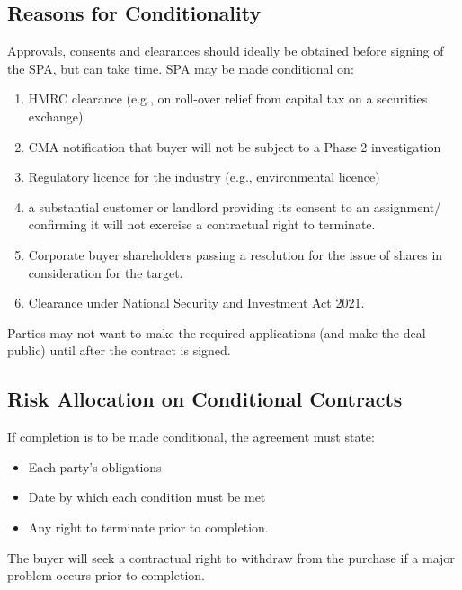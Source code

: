 \documentclass[
]{article}
\providecommand{\tightlist}{%
  \setlength{\itemsep}{0pt}\setlength{\parskip}{0pt}}
\begin{document}
\hypertarget{reasons-for-conditionality}{%
\subsection{Reasons for
Conditionality}\label{reasons-for-conditionality}}

Approvals, consents and clearances should ideally be obtained before
signing of the SPA, but can take time. SPA may be made conditional on:

\begin{enumerate}
\def\labelenumi{\arabic{enumi}.}
\tightlist
\item
  HMRC clearance (e.g., on roll-over relief from capital tax on a
  securities exchange)
\item
  CMA notification that buyer will not be subject to a Phase 2
  investigation
\item
  Regulatory licence for the industry (e.g., environmental licence)
\item
  a substantial customer or landlord providing its consent to an
  assignment/ confirming it will not exercise a contractual right to
  terminate.
\item
  Corporate buyer shareholders passing a resolution for the issue of
  shares in consideration for the target.
\item
  Clearance under National Security and Investment Act 2021.
\end{enumerate}

Parties may not want to make the required applications (and make the
deal public) until after the contract is signed.

\hypertarget{risk-allocation-on-conditional-contracts}{%
\subsection{Risk Allocation on Conditional
Contracts}\label{risk-allocation-on-conditional-contracts}}

If completion is to be made conditional, the agreement must state:

\begin{itemize}
\tightlist
\item
  Each party's obligations
\item
  Date by which each condition must be met
\item
  Any right to terminate prior to completion.
\end{itemize}

The buyer will seek a contractual right to withdraw from the purchase if
a major problem occurs prior to completion.
\end{document}
